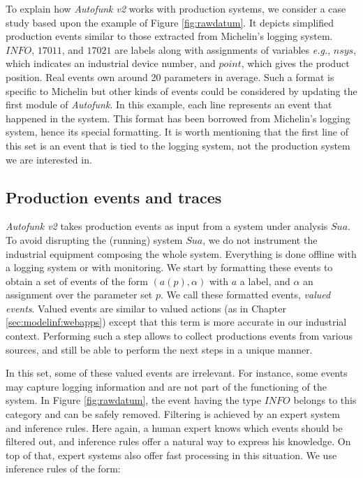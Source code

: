 \begin{example}
To explain how \textit{Autofunk v2} works with production
systems, we consider a case study based upon the example of
Figure \ref{fig:rawdatum}. It depicts simplified production
events similar to those extracted from Michelin's logging system.
$INFO$, $17011$, and $17021$ are labels along with assignments of
variables \emph{e.g.}, $nsys$, which indicates an industrial
device number, and $point$, which gives the product position.
Real events own around 20 parameters in average. Such a format is
specific to Michelin but other kinds of events could be
considered by updating the first module of \textit{Autofunk}.  In
this example, each line represents an event that happened in the
system. This format has been borrowed from Michelin's logging
system, hence its special formatting. It is worth mentioning that
the first line of this set is an event that is tied to the
logging system, not the production system we are interested in.
\end{example}

\subsection{Production events and traces}
\label{part3:collecting}

\textit{Autofunk v2} takes production events as input from a
system under analysis $\mathit{Sua}$. To avoid disrupting the
(running) system $\mathit{Sua}$, we do not instrument the
industrial equipment composing the whole system. Everything is
done offline with a logging system or with monitoring. We start
by formatting these events to obtain a set of events of the form
$(a(p), \alpha)$ with $a$ a label, and $\alpha$ an assignment
over the parameter set $p$. We call these formatted events,
\textit{valued events}. Valued events are similar to valued
actions (as in Chapter \ref{sec:modelinf:webapps}) except that
this term is more accurate in our industrial context. Performing
such a step allows to collect productions events from various
sources, and still be able to perform the next steps in a unique
manner.

In this set, some of these valued events are irrelevant.  For
instance, some events may capture logging information and are not
part of the functioning of the system. In Figure
\ref{fig:rawdatum}, the event having the type $INFO$ belongs to
this category and can be safely removed. Filtering is achieved by
an expert system and inference rules. Here again, a human expert
knows which events should be filtered out, and inference rules
offer a natural way to express his knowledge. On top of that,
expert systems also offer fast processing in this situation. We
use inference rules of the form:

